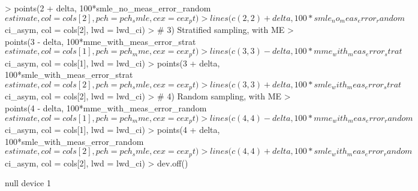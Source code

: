 \documentclass{article}
\begin{document}
\begin{Schunk}
\begin{Sinput}
> points(2 + delta, 100*smle_no_meas_error_random$estimate, col = cols[2], pch = pch_smle, cex = cex_pt)
> lines(c(2, 2) + delta, 100*smle_no_meas_error_random$ci_asym, col = cols[2], lwd = lwd_ci)
> # 3) Stratified sampling, with ME
> points(3 - delta, 100*mme_with_meas_error_strat$estimate, col = cols[1], pch = pch_mme, cex = cex_pt)
> lines(c(3, 3) - delta, 100*mme_with_meas_error_strat$ci_asym, col = cols[1], lwd = lwd_ci)
> points(3 + delta, 100*smle_with_meas_error_strat$estimate, col = cols[2], pch = pch_smle, cex = cex_pt)
> lines(c(3, 3) + delta, 100*smle_with_meas_error_strat$ci_asym, col = cols[2], lwd = lwd_ci)
> # 4) Random sampling, with ME
> points(4 - delta, 100*mme_with_meas_error_random$estimate, col = cols[1], pch = pch_mme, cex = cex_pt)
> lines(c(4, 4) - delta, 100*mme_with_meas_error_random$ci_asym, col = cols[1], lwd = lwd_ci)
> points(4 + delta, 100*smle_with_meas_error_random$estimate, col = cols[2], pch = pch_smle, cex = cex_pt)
> lines(c(4, 4) + delta, 100*smle_with_meas_error_random$ci_asym, col = cols[2], lwd = lwd_ci)
> dev.off()
\end{Sinput}
\begin{Soutput}
null device 
          1 
\end{Soutput}
\end{Schunk}
\end{document}
